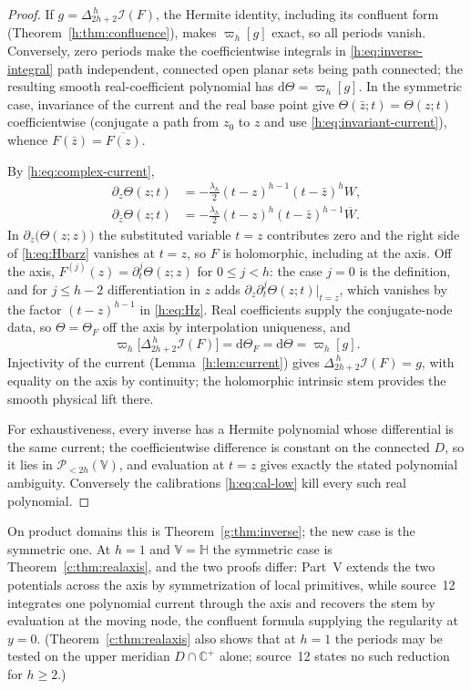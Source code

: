 \documentclass[11pt,a4paper]{article}
\numberwithin{equation}{section}
\theoremstyle{definition}
\theoremstyle{remark}
\theoremstyle{plain}
\newcommand{\HH}{\mathbb H}
\newcommand{\CC}{\mathbb C}
\newcommand{\Cplus}{\CC^{+}}
\newcommand{\I}{\mathcal I}
\newcommand{\dd}{\mathrm d}
\newcommand{\lapH}{\Delta_{2h+2}^{\,h}}
\newcommand{\VV}{\mathbb V}                       %
\newcommand{\PolH}{\mathscr P_{<2h}(\VV)}
\newcommand{\cur}{\varpi}                         %
\newcommand{\Herm}{\Theta}                        %
\begin{document}
\begin{proof}
If $g=\lapH\I(F)$, the Hermite identity, including its confluent form
(Theorem~\ref{h:thm:confluence}), makes $\cur_h[g]$ exact, so all periods
vanish. Conversely, zero periods make the coefficientwise integrals in
\eqref{h:eq:inverse-integral} path independent, connected open planar sets
being path connected; the resulting smooth real-coefficient polynomial has
$\dd\Herm=\cur_h[g]$. In the symmetric case, invariance of the current and the
real base point give $\Herm(\bar z;t)=\Herm(z;t)$ coefficientwise (conjugate
a path from $z_0$ to $z$ and use \eqref{h:eq:invariant-current}), whence
$F(\bar z)=\overline{F(z)}$.

By \eqref{h:eq:complex-current},
\begin{align}
 \partial_z\Herm(z;t)&=-\frac{\lambda_h}{2}(t-z)^{h-1}(t-\bar z)^hW,
 \label{h:eq:Hz}\\
 \partial_{\bar z}\Herm(z;t)&=-\frac{\lambda_h}{2}(t-z)^h(t-\bar z)^{h-1}
 \overline W .\label{h:eq:Hbarz}
\end{align}
In $\partial_{\bar z}\bigl(\Herm(z;z)\bigr)$ the substituted variable $t=z$
contributes zero and the right side of \eqref{h:eq:Hbarz} vanishes at $t=z$, so
$F$ is holomorphic, including at the axis. Off the axis,
$F^{(j)}(z)=\partial_t^j\Herm(z;z)$ for $0\le j<h$: the case $j=0$ is the
definition, and for $j\le h-2$ differentiation in $z$ adds
$\partial_z\partial_t^j\Herm(z;t)|_{t=z}$, which vanishes by the factor
$(t-z)^{h-1}$ in \eqref{h:eq:Hz}. Real coefficients supply the conjugate-node
data, so $\Herm=\Herm_F$ off the axis by interpolation uniqueness, and
\[
 \cur_h\bigl[\lapH\I(F)\bigr]=\dd\Herm_F=\dd\Herm=\cur_h[g].
\]
Injectivity of the current (Lemma~\ref{h:lem:current}) gives
$\lapH\I(F)=g$, with equality on the axis by continuity; the holomorphic
intrinsic stem provides the smooth physical lift there.

For exhaustiveness, every inverse has a Hermite polynomial whose differential
is the same current; the coefficientwise difference is constant on the
connected $D$, so it lies in $\PolH$, and evaluation at $t=z$ gives exactly the
stated polynomial ambiguity. Conversely the calibrations \eqref{h:eq:cal-low}
kill every such real polynomial.
\end{proof}

On product domains this is Theorem~\ref{g:thm:inverse}; the new case is the
symmetric one. At $h=1$ and $\VV=\HH$ the symmetric case is
Theorem~\ref{c:thm:realaxis}, and the two proofs differ: Part~V extends the
two potentials across the axis by symmetrization of local primitives, while
source~12 integrates one polynomial current through the axis and recovers the
stem by evaluation at the moving node, the confluent formula supplying the
regularity at $y=0$. (Theorem~\ref{c:thm:realaxis} also shows that at $h=1$
the periods may be tested on the upper meridian $D\cap\Cplus$ alone; source~12
states no such reduction for $h\ge2$.)
\end{document}
